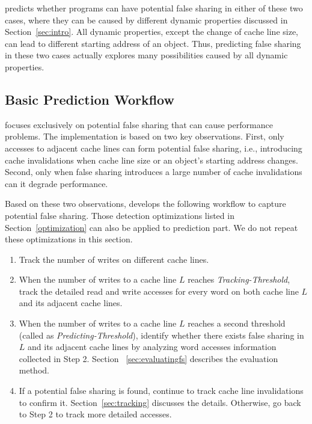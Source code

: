 \Predator{} predicts whether programs can have potential false sharing  
in either of these two cases, where they can be caused by different dynamic properties 
discussed in Section~\ref{sec:intro}.
All dynamic properties, except the change of cache line size,
can lead to different starting address of an object. 
Thus, predicting false sharing in these two cases actually 
explores many possibilities caused by all dynamic properties.

\subsection{Basic Prediction Workflow}
\label{sec:predictionmechanism} 

\Predator{} focuses exclusively on potential false sharing that can 
cause performance problems.
The implementation is based on
two key observations. First, only accesses to 
adjacent cache lines can form potential false sharing, 
i.e., introducing cache invalidations when cache line size
or an object's starting address changes.
Second, only when false sharing introduces a large number of cache invalidations
can it degrade performance.

Based on these two observations, \Predator{} develops 
the following workflow to capture potential false sharing.
Those detection optimizations listed in Section~\ref{optimization} can also be applied
to prediction part. We do not repeat these optimizations in this section.

\begin{enumerate}
\item
Track the number of writes on different cache lines. 

\item
When the number of writes to a cache line $L$ reaches {\it Tracking-Threshold},
track the detailed read and write accesses for every word on both cache line $L$ 
and its adjacent cache lines. 

\item
When the number of writes to a cache line $L$ reaches a second threshold (called as
{\it Predicting-Threshold}), 
identify whether there exists false sharing in $L$ and its adjacent 
cache lines by analyzing word accesses information collected in Step 2. 
Section ~\ref{sec:evaluatingfs} describes the evaluation method.

\item
If a potential false sharing is found, continue to track cache line invalidations to confirm it. Section~\ref{sec:tracking} discusses the details.
Otherwise, go back to Step 2 to track more detailed accesses.
 
\end{enumerate}

